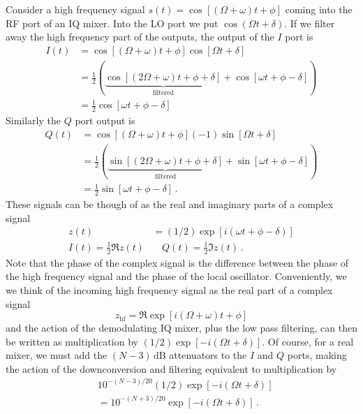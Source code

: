 Consider a high frequency signal $s(t) = \cos [ (\Omega+\omega)t + \phi ]$ coming into the RF port of an IQ mixer. Into the LO port we put $\cos(\Omega t + \delta)$. If we filter away the high frequency part of the outputs, the output of the $I$ port is
\begin{align}
I(t) &= \cos [ (\Omega + \omega)t + \phi ] \cos [ \Omega t + \delta ] \nonumber \\
&= \frac{1}{2}\left( \underbrace{\cos [(2\Omega + \omega)t + \phi + \delta ]}_\text{filtered} + \cos [ \omega t + \phi - \delta ] \right) \nonumber \\
&= \frac{1}{2} \cos [ \omega t + \phi - \delta ]
\end{align}
Similarly the $Q$ port output is
\begin{align}
Q(t) &= \cos [ (\Omega + \omega)t + \phi ](-1)\sin [ \Omega t + \delta ] \nonumber \\
&= \frac{1}{2}\left( \underbrace{\sin [(2\Omega + \omega)t + \phi + \delta ]}_\text{filtered} + \sin [ \omega t + \phi - \delta ] \right) \nonumber \\
&= \frac{1}{2} \sin [ \omega t + \phi - \delta ] \, .
\end{align}
These signals can be though of as the real and imaginary parts of a complex signal
\begin{align}
z(t) &= (1/2) \exp \left[i \left( \omega t + \phi - \delta \right) \right] \\
I(t) = \frac{1}{2}\Re z(t) & \quad Q(t) = \frac{1}{2}\Im z(t) \, .
\end{align}
Note that the phase of the complex signal is the difference between the phase of the high frequency signal and the phase of the local oscillator. Conveniently, we we think of the incoming high frequency signal as the real part of a complex signal
\begin{equation}
z_{\textrm{hf}}=\Re \exp \left[ i \left( \Omega + \omega \right)t +\phi \right]
\end{equation}
and the action of the demodulating IQ mixer, plus the low pass filtering, can then be written as multiplication by $(1/2) \exp \left[ -i( \Omega t + \delta ) \right]$.
Of course, for a real mixer, we must add the $(N-3)\,\text{dB}$ attenuators to the $I$ and $Q$ ports, making the action of the downconversion and filtering equivalent to multiplication by
\begin{align*}
& 10^{-(N-3)/20} (1/2) \exp \left[ -i (\Omega t + \delta) \right] \\
&= 10^{-(N+3)/20} \exp \left[ -i ( \Omega t + \delta) \right] \, .
\end{align*}

